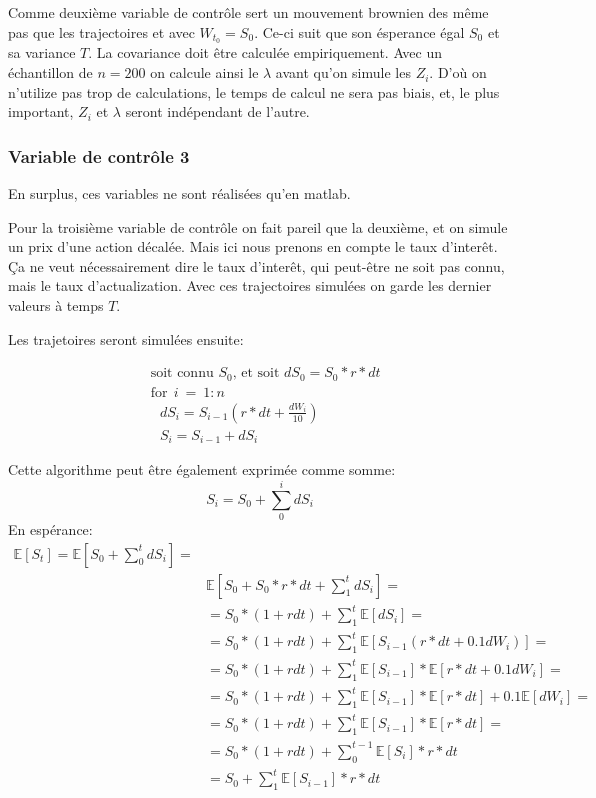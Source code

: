 \documentclass[a4paper,12pt]{scrartcl}
\begin{document}
Comme deuxième variable de contrôle sert un mouvement brownien des même pas que les trajectoires et avec $W_{t_0}=S_0$.
Ce-ci suit que son ésperance égal $S_0$ et sa variance $T$.
La covariance doit être calculée empiriquement.
Avec un échantillon de $n=200$ on calcule ainsi le $\lambda$ avant qu'on simule les $Z_i$.
D'où on n'utilize pas trop de calculations, le temps de calcul ne sera pas biais,
et, le plus important, $Z_i$ et $\lambda$ seront indépendant de l'autre.



\subsubsection{Variable de contrôle 3}
En surplus, ces variables ne sont réalisées qu'en matlab.

Pour la troisième variable de contrôle on fait pareil que la deuxième, et on simule un prix d'une action décalée.
Mais ici nous prenons en compte le taux d'interêt. Ça ne veut nécessairement dire le taux d'interêt, qui peut-être ne soit pas connu, mais le taux d'actualization.
Avec ces trajectoires simulées on garde les dernier valeurs à temps $T$.

Les trajetoires seront simulées ensuite:


\begin{align*}
&\text{soit connu } S_0 \text{, et soit } dS_0 = S_0* r*dt  \\
&\text{for}~~ i~=~1:n \\
&~~~ dS_i = S_{i-1}(r*dt + \frac{dW_{i}}{10}) \\
&~~~ S_i  = S_{i-1} + dS_i
\end{align*}

Cette algorithme peut être également exprimée comme somme:
$$S_i = S_0 + \sum_0^i dS_i$$
En espérance:
\begin{align*}
\mathbb{E}[S_t] = 
\mathbb{E}[S_0 + \sum_0^t dS_i] =  \\
&\mathbb{E}[S_0 + S_0*r*dt +\sum_1^t dS_i] = \\ 
&= S_0*(1+rdt) + \sum_1^t \mathbb{E}[dS_i] = \\
&= S_0*(1+rdt) + \sum_1^t \mathbb{E}[S_{i-1}(r*dt + 0.1dW_{i})] = \\
&= S_0*(1+rdt) + \sum_1^t \mathbb{E}[S_{i-1}]*\mathbb{E}[r*dt + 0.1dW_{i}] = \\
&= S_0*(1+rdt) + \sum_1^t \mathbb{E}[S_{i-1}]*\mathbb{E}[r*dt] + 
                 0.1\mathbb{E}[dW_{i}] = \\
&= S_0*(1+rdt) + \sum_1^t \mathbb{E}[S_{i-1}]*\mathbb{E}[r*dt] = \\
&= S_0*(1+rdt) + \sum_0^{t-1} \mathbb{E}[S_{i}]*r*dt \\
&= S_0 + \sum_1^t \mathbb{E}[S_{i-1}]*r*dt
\end{align*}
\end{document}
